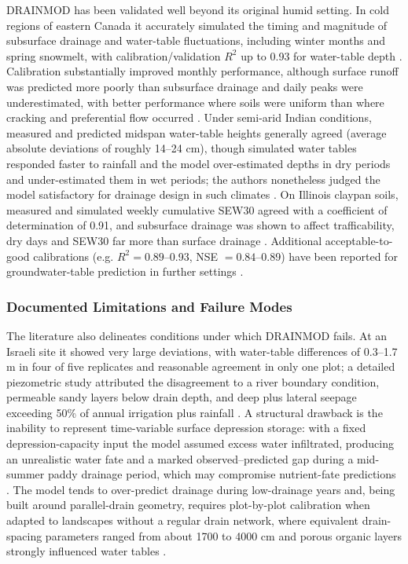\documentclass[11pt]{article}
\begin{document}
\textsc{DRAINMOD} has been validated well beyond its original humid setting. In cold regions of eastern Canada it accurately simulated the timing and magnitude of subsurface drainage and water-table fluctuations, including winter months and spring snowmelt, with calibration/validation $R^2$ up to 0.93 for water-table depth \parencite{Dayyani2009,Morrison2014}. Calibration substantially improved monthly performance, although surface runoff was predicted more poorly than subsurface drainage and daily peaks were underestimated, with better performance where soils were uniform than where cracking and preferential flow occurred \parencite{Morrison2014}. Under semi-arid Indian conditions, measured and predicted midspan water-table heights generally agreed (average absolute deviations of roughly 14--24 cm), though simulated water tables responded faster to rainfall and the model over-estimated depths in dry periods and under-estimated them in wet periods; the authors nonetheless judged the model satisfactory for drainage design in such climates \parencite{GUPTA1993}. On Illinois claypan soils, measured and simulated weekly cumulative SEW30 agreed with a coefficient of determination of 0.91, and subsurface drainage was shown to affect trafficability, dry days and SEW30 far more than surface drainage \parencite{MOSTAGHIMI1989}. Additional acceptable-to-good calibrations (e.g. $R^2=0.89$--0.93, NSE $=0.84$--0.89) have been reported for groundwater-table prediction in further settings \parencite{Abduljaleel2023,Awad2022b}.

\subsubsection{Documented Limitations and Failure Modes}

The literature also delineates conditions under which \textsc{DRAINMOD} fails. At an Israeli site it showed very large deviations, with water-table differences of 0.3--1.7 m in four of five replicates and reasonable agreement in only one plot; a detailed piezometric study attributed the disagreement to a river boundary condition, permeable sandy layers below drain depth, and deep plus lateral seepage exceeding 50\% of annual irrigation plus rainfall \parencite{Sinai2006}. A structural drawback is the inability to represent time-variable surface depression storage: with a fixed depression-capacity input the model assumed excess water infiltrated, producing an unrealistic water fate and a marked observed--predicted gap during a mid-summer paddy drainage period, which may compromise nutrient-fate predictions \parencite{Abduljaleel2023}. The model tends to over-predict drainage during low-drainage years \parencite{Singh2006b} and, being built around parallel-drain geometry, requires plot-by-plot calibration when adapted to landscapes without a regular drain network, where equivalent drain-spacing parameters ranged from about 1700 to 4000 cm and porous organic layers strongly influenced water tables \parencite{He2002}.
\end{document}
